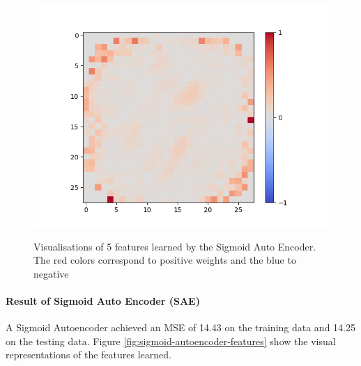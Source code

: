 \begin{figure}[H]
\begin{minipage}[b]{0.19\textwidth}
		\includegraphics[width=\textwidth]{Linear-AE/Feature-18.png}
		\label{}
	\end{minipage}
	
	\caption{Visualisations of 5 features learned by the Sigmoid Auto Encoder. The red colors correspond to positive weights and the blue to negative}
	\label{fig:linear-autoencoder-features}
	\hfill
\end{figure}

\paragraph{Result of Sigmoid Auto Encoder (SAE)}
A Sigmoid Autoencoder achieved an MSE of 14.43 on the training data and 14.25 on the testing data. Figure \ref{fig:sigmoid-autoencoder-features} show the visual representations of the features learned.

